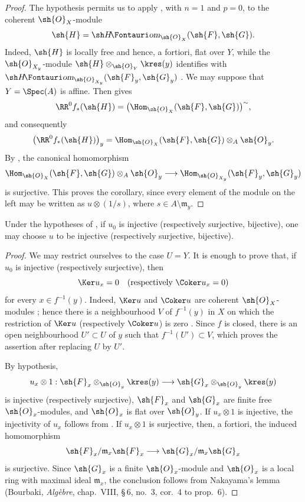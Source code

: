 \begin{proof}
The hypothesis permits us to apply , with $n=1$
and $p=0$, to the coherent $\sh{O}_X$-module
\[
  \sh{H}=\shHom_{\sh{O}_X}(\sh{F},\sh{G}).
\]
Indeed, $\sh{H}$ is locally free and hence, a fortiori, flat over
$Y$, while the $\sh{O}_{X_y}$-module
$\sh{H}\otimes_{\sh{O}_Y}\kres(y)$ identifies with
$\shHom_{\sh{O}_{X_y}}(\sh{F}_y,\sh{G}_y)$
.  We may suppose that $Y=\Spec(A)$ is affine.
Then  gives
\[
  \RR^0f_*(\sh{H})
  =
  \bigl(\Hom_{\sh{O}_X}(\sh{F},\sh{G})\bigr)^{\sim},
\]
and consequently
\[
  \bigl(\RR^0f_*(\sh{H})\bigr)_y
  =
  \Hom_{\sh{O}_X}(\sh{F},\sh{G})
    \otimes_A\sh{O}_y.
\]
By , the canonical homomorphism
\[
  \Hom_{\sh{O}_X}(\sh{F},\sh{G})
    \otimes_A\sh{O}_y
  \longrightarrow
  \Hom_{\sh{O}_{X_y}}(\sh{F}_y,\sh{G}_y)
\]
is surjective.  This proves the corollary, since every element of
the module on the left may be written as $u\otimes(1/s)$, where
$s\in A\setminus\mathfrak m_y$.
\end{proof}

\begin{corollary}[4.6.3]
\label{III.4.6.3}
Under the hypotheses of , if $u_0$ is injective
(respectively surjective, bijective), one may choose $u$ to be
injective (respectively surjective, bijective).
\end{corollary}

\begin{proof}
We may restrict ourselves to the case $U=Y$.  It is enough to prove
that, if $u_0$ is injective (respectively surjective), then
\[
  \Ker u_x=0
  \quad\text{(respectively }\Coker u_x=0\text{)}
\]
for every $x\in f^{-1}(y)$.  Indeed, $\Ker u$ and $\Coker u$ are
coherent $\sh{O}_X$-modules ; hence there is a
neighbourhood $V$ of $f^{-1}(y)$ in $X$ on which the restriction of
$\Ker u$ (respectively $\Coker u$) is zero .
Since $f$ is closed, there is an open neighbourhood
$U'\subset U$ of $y$ such that $f^{-1}(U')\subset V$, which proves
the assertion after replacing $U$ by $U'$.


By hypothesis,
\[
  u_x\otimes1:
  \sh{F}_x\otimes_{\sh{O}_y}\kres(y)
  \longrightarrow
  \sh{G}_x\otimes_{\sh{O}_y}\kres(y)
\]
is injective (respectively surjective), $\sh{F}_x$ and $\sh{G}_x$
are finite free $\sh{O}_x$-modules, and $\sh{O}_x$ is flat over
$\sh{O}_y$.  If $u_x\otimes1$ is injective, the injectivity of $u_x$
follows from .  If $u_x\otimes1$ is surjective,
then, a fortiori, the induced homomorphism
\[
  \sh{F}_x/\mathfrak m_x\sh{F}_x
  \longrightarrow
  \sh{G}_x/\mathfrak m_x\sh{G}_x
\]
is surjective.  Since $\sh{G}_x$ is a finite $\sh{O}_x$-module and
$\sh{O}_x$ is a local ring with maximal ideal $\mathfrak m_x$, the
conclusion follows from Nakayama's lemma (Bourbaki,
\emph{Alg\`ebre}, chap.~VIII, \S\,6, no.~3, cor.~4 to prop.~6).
\end{proof}

